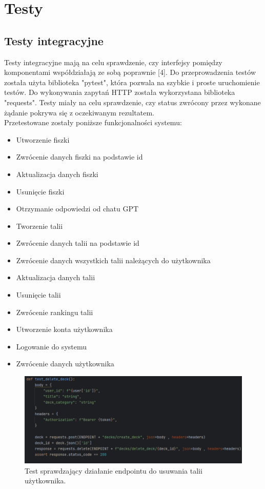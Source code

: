 \chapter{Testy}

\section{Testy integracyjne}

Testy integracyjne mają na celu sprawdzenie, czy interfejsy pomiędzy komponentami współdziałają ze sobą poprawnie [4]. Do przeprowadzenia testów została użyta biblioteka "pytest", która pozwala na szybkie i proste uruchomienie testów. Do wykonywania zapytań HTTP została wykorzystana biblioteka "requests". Testy miały na celu sprawdzenie, czy status zwrócony przez wykonane żądanie pokrywa się z oczekiwanym rezultatem.\\
Przetestowane zostały poniższe funkcjonalności systemu:

\begin{itemize}
    \item Utworzenie fiszki
    \item Zwrócenie danych fiszki na podstawie id
    \item Aktualizacja danych fiszki
    \item Usunięcie fiszki
    \item Otrzymanie odpowiedzi od chatu GPT
    \item Tworzenie talii
    \item Zwrócenie danych talii na podstawie id
    \item Zwrócenie danych wszystkich talii należących do użytkownika
    \item Aktualizacja danych talii
    \item Usunięcie talii
    \item Zwrócenie rankingu talii
    \item Utworzenie konta użytkownika
    \item Logowanie do systemu
    \item Zwrócenie danych użytkownika
\end{itemize}

\begin{figure}[H]
    \centering
    \includegraphics[width=1\textwidth]{chapters/chapter_9/testy1}
    \caption{Test sprawdzający działanie endpointu do usuwania talii użytkownika.}
    \label{img:testy}
\end{figure}

